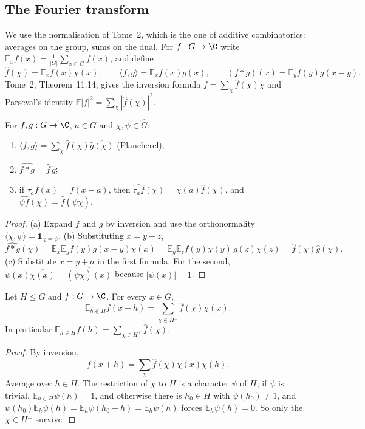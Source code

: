 \subsection*{The Fourier transform}

We use the normalisation of Tome~2, which is the one of additive combinatorics: averages on the group, sums on the dual. For
$f:G\to\C$ write $\mathbb E_{x}f(x)=\frac1{|G|}\sum_{x\in G}f(x)$, and define
\[\hat f(\chi)=\mathbb E_{x}f(x)\overline{\chi(x)},\qquad\langle f,g\rangle=\mathbb E_{x}f(x)\overline{g(x)},\qquad(f*g)(x)=\mathbb E_{y}f(y)g(x-y).\]
Tome~2, Theorem~11.14, gives the inversion formula $f=\sum_\chi\hat f(\chi)\chi$ and Parseval's identity $\mathbb E|f|^2=\sum_\chi|\hat f(\chi)|^2$.

\begin{proposition}\label{prop:finiteconv}
For $f,g:G\to\C$, $a\in G$ and $\chi,\psi\in\widehat G$:
\begin{enumerate}
\item[(a)] $\langle f,g\rangle=\sum_\chi\hat f(\chi)\overline{\hat g(\chi)}$ (Plancherel);
\item[(b)] $\widehat{f*g}=\hat f\,\hat g$;
\item[(c)] if $\tau_af(x)=f(x-a)$, then $\widehat{\tau_af}(\chi)=\overline{\chi(a)}\hat f(\chi)$, and $\widehat{\psi f}(\chi)=\hat f(\overline\psi\chi)$.
\end{enumerate}
\end{proposition}
\begin{proof}
(a) Expand $f$ and $g$ by inversion and use the orthonormality $\langle\chi,\psi\rangle=\mathbf 1_{\chi=\psi}$. (b) Substituting $x=y+z$,
\[\widehat{f*g}(\chi)=\mathbb E_x\mathbb E_yf(y)g(x-y)\overline{\chi(x)}=\mathbb E_y\mathbb E_zf(y)\overline{\chi(y)}\,g(z)\overline{\chi(z)}=\hat f(\chi)\hat g(\chi).\]
(c) Substitute $x=y+a$ in the first formula. For the second, $\psi(x)\overline{\chi(x)}=\overline{(\overline\psi\chi)(x)}$ because $|\psi(x)|=1$.
\end{proof}

\begin{theorem}\label{thm:poissonfinite}
Let $H\le G$ and $f:G\to\C$. For every $x\in G$,
\[\mathbb E_{h\in H}f(x+h)=\sum_{\chi\in H^\perp}\hat f(\chi)\chi(x).\]
In particular $\mathbb E_{h\in H}f(h)=\sum_{\chi\in H^\perp}\hat f(\chi)$.
\end{theorem}
\begin{proof}
By inversion,
\[f(x+h)=\sum_\chi\hat f(\chi)\chi(x)\chi(h).\]
Average over $h\in H$. The restriction of $\chi$ to $H$ is a character $\psi$
of $H$; if $\psi$ is trivial, $\mathbb E_{h\in H}\psi(h)=1$, and otherwise there is $h_0\in H$ with $\psi(h_0)\ne1$, and
$\psi(h_0)\mathbb E_h\psi(h)=\mathbb E_h\psi(h_0+h)=\mathbb E_h\psi(h)$ forces $\mathbb E_h\psi(h)=0$. So only the $\chi\in H^\perp$ survive.
\end{proof}

